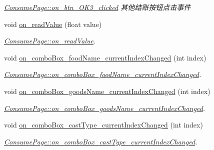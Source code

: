 \begin{DoxyCompactItemize}
\begin{DoxyCompactList}\small\item\em \mbox{\hyperlink{class_consume_page_a3d244573d28510df3c7b3ca0d6eb3843}{Consume\+Page\+::on\+\_\+btn\+\_\+\+O\+K3\+\_\+clicked}} 其他结账按钮点击事件 \end{DoxyCompactList}\item 
void \mbox{\hyperlink{class_consume_page_aee88a9a496e88620383622b4ab20e4c9}{on\+\_\+read\+Value}} (float value)
\begin{DoxyCompactList}\small\item\em \mbox{\hyperlink{class_consume_page_aee88a9a496e88620383622b4ab20e4c9}{Consume\+Page\+::on\+\_\+read\+Value}}. \end{DoxyCompactList}\item 
void \mbox{\hyperlink{class_consume_page_a56362bbe10626bb02c7cba7e11545274}{on\+\_\+combo\+Box\+\_\+food\+Name\+\_\+current\+Index\+Changed}} (int index)
\begin{DoxyCompactList}\small\item\em \mbox{\hyperlink{class_consume_page_a56362bbe10626bb02c7cba7e11545274}{Consume\+Page\+::on\+\_\+combo\+Box\+\_\+food\+Name\+\_\+current\+Index\+Changed}}. \end{DoxyCompactList}\item 
void \mbox{\hyperlink{class_consume_page_af5d7e2bc17a792db28f9e1dd205574e2}{on\+\_\+combo\+Box\+\_\+goods\+Name\+\_\+current\+Index\+Changed}} (int index)
\begin{DoxyCompactList}\small\item\em \mbox{\hyperlink{class_consume_page_af5d7e2bc17a792db28f9e1dd205574e2}{Consume\+Page\+::on\+\_\+combo\+Box\+\_\+goods\+Name\+\_\+current\+Index\+Changed}}. \end{DoxyCompactList}\item 
void \mbox{\hyperlink{class_consume_page_a6db19d3147a2143286022e5bca7dc3fa}{on\+\_\+combo\+Box\+\_\+cast\+Type\+\_\+current\+Index\+Changed}} (int index)
\begin{DoxyCompactList}\small\item\em \mbox{\hyperlink{class_consume_page_a6db19d3147a2143286022e5bca7dc3fa}{Consume\+Page\+::on\+\_\+combo\+Box\+\_\+cast\+Type\+\_\+current\+Index\+Changed}}. \end{DoxyCompactList}\end{DoxyCompactItemize}

